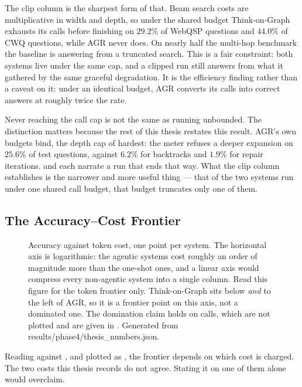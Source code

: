 The clip column is the sharpest form of that. Beam search costs are
multiplicative in width and depth, so under the shared budget Think-on-Graph
exhausts its calls before finishing on $29.2\%$ of WebQSP questions and $44.0\%$
of CWQ questions, while AGR never does. On nearly half the multi-hop benchmark
the baseline is answering from a truncated search. This is a fair constraint:
both systems live under the same cap, and a clipped run still answers from what
it gathered by the same graceful degradation. It is the efficiency
finding rather than a caveat on it: under an identical budget, AGR converts its
calls into correct answers at roughly twice the rate.

Never reaching the call cap is not the same as running unbounded. The
distinction matters because the rest of this thesis restates this result. AGR's
own budgets bind, the depth cap of  hardest: the meter refuses
a deeper expansion on $25.6\%$ of test questions, against $6.2\%$ for backtracks
and $1.9\%$ for repair iterations.  and
 each narrate a run that ends that way. What the clip
column establishes is the narrower and more useful thing --- that of the two
systems run under one shared call budget, that budget truncates only one of
them.

\subsection{The Accuracy--Cost Frontier}

\begin{figure}[!tb]
  \begin{center}
    
  \end{center}
  \caption[Accuracy against token cost]{Accuracy against token cost, one point
  per system. The horizontal axis is logarithmic: the agentic systems cost
  roughly an order of magnitude more than the one-shot ones, and a linear axis
  would compress every non-agentic system into a single column. Read this figure
  for the token frontier only. Think-on-Graph sits below \emph{and} to the left
  of AGR, so it is a frontier point on this axis, not a dominated one. The
  domination claim holds on calls, which are not plotted and are given in
  . Generated from
  \textsf{results/phase4/thesis\_numbers.json}.}
  \label{fig:accuracy-cost}
\end{figure}

Reading  against , and plotted
as , the frontier depends on which cost is
charged. The two costs this thesis records do not agree. Stating it on one
of them alone would overclaim.

